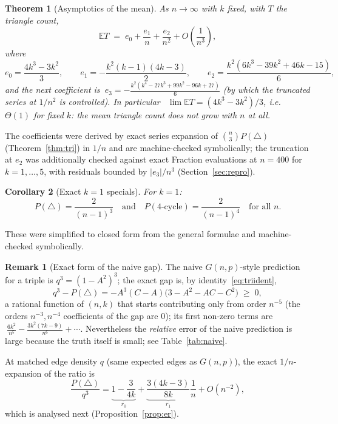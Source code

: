 \documentclass[11pt,a4paper]{article}
\newtheorem{theorem}{Theorem}[section]
\newtheorem{corollary}[theorem]{Corollary}
\theoremstyle{definition}
\newtheorem*{remark}{Remark}
\theoremstyle{definition}
\begin{document}
\begin{theorem}[Asymptotics of the mean]\label{thm:triasy}
As $n\to\infty$ with $k$ fixed, with $T$ the triangle count,
\[
\mathbb E T \;=\;e_0+\frac{e_1}{n}+\frac{e_2}{n^{2}}
+O\!\left(\frac{1}{n^{3}}\right),
\]
where
\[
e_0=\frac{4k^{3}-3k^{2}}{3},\qquad
e_1=-\frac{k^{2}(k-1)(4k-3)}{2},\qquad
e_2=\frac{k^{2}(6k^{3}-39k^{2}+46k-15)}{6},
\]
and the next coefficient is
$\ e_3=-\frac{k^{2}(k^{4}-27k^{3}+99k^{2}-96k+27)}{6}$
(by which the truncated series at $1/n^{2}$ is controlled).
In particular \ $\lim \mathbb E T = (4k^{3}-3k^{2})/3$, i.e.\ $\Theta(1)$ for fixed
$k$: the mean triangle count does not grow with $n$ at all.
\end{theorem}

The coefficients were derived by exact series expansion of
$\binom{n}{3}P(\triangle)$ (Theorem~\ref{thm:tri}) in $1/n$ and are machine-checked
symbolically; the truncation at $e_2$ was additionally checked against exact
Fraction evaluations at $n=400$ for $k=1,\dots,5$, with residuals bounded by
$|e_3|/n^3$ (Section~\ref{sec:repro}).

\begin{corollary}[Exact $k=1$ specials]\label{cor:k1}
For $k=1$:
\[
P(\triangle) = \frac{2}{(n-1)^{3}}\quad\text{and}\quad
P(\text{4-cycle}) = \frac{2}{(n-1)^{4}}
\quad\text{for all } n.
\]
\end{corollary}
These were simplified to closed form from the general formulae and
machine-checked symbolically.

\begin{remark}[Exact form of the naive gap]\label{rem:gap}
The naive $G(n,p)$-style prediction for a triple is $q^{3}=(1-A^{2})^{3}$; the exact
gap is, by identity~\eqref{eq:triident},
\[
q^{3}-P(\triangle) = -A^{3}(C-A)\bigl(3-A^{2}-AC-C^{2}\bigr)\;\ge\;0,
\]
a rational function of $(n,k)$ that starts contributing only from order $n^{-5}$
(the orders $n^{-3},n^{-4}$ coefficients of the gap are $0$);
its first non-zero terms are $\ \frac{6k^{2}}{n^{5}}
-\frac{3k^{2}(7k-9)}{n^{6}}+\cdots$. Nevertheless the \emph{relative} error of the
naive prediction is large because the truth itself is small; see
Table~\ref{tab:naive}.

\medskip
At matched edge density $q$ (same expected edges as $G(n,p)$), the exact
$1/n$-expansion of the ratio is
\[
\frac{P(\triangle)}{q^{3}}
= \underbrace{1-\frac{3}{4k}}_{r_0}
+ \underbrace{\frac{3(4k-3)}{8k}}_{r_1}\frac{1}{n}+O(n^{-2}),
\]
which is analysed next (Proposition~\ref{prop:er}).
\end{remark}
\end{document}

